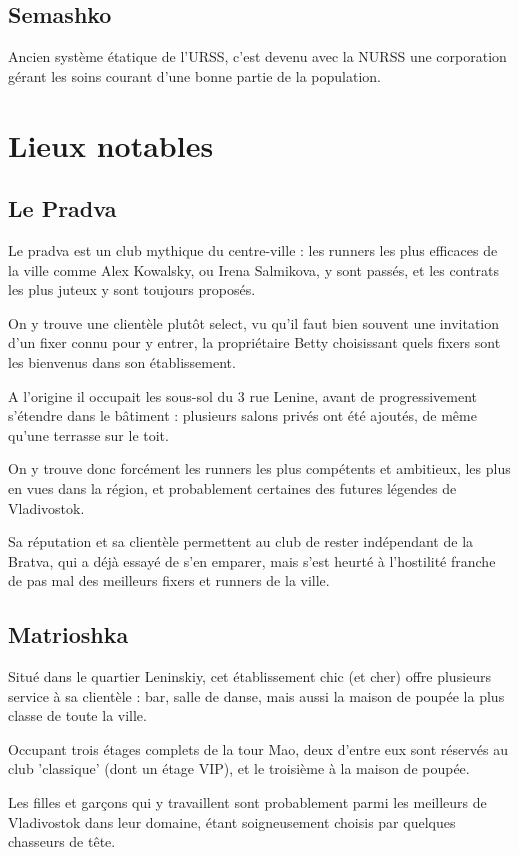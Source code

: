 \documentclass[10pt,a4paper]{book}
\begin{document}
\section{Semashko }
Ancien système étatique de l'URSS, c'est devenu avec la NURSS une corporation gérant les soins courant d'une bonne partie de la population.
\chapter{Lieux notables}
\section{Le Pradva}
Le pradva est un club mythique du centre-ville : les runners les plus efficaces de la ville comme Alex Kowalsky, ou Irena Salmikova, y sont passés, et les contrats les plus juteux y sont toujours proposés.

On y trouve une clientèle plutôt select, vu qu'il faut bien souvent une invitation d'un fixer connu pour y entrer, la propriétaire Betty choisissant quels fixers sont les bienvenus dans son établissement.

A l'origine il occupait les sous-sol du 3 rue Lenine, avant de progressivement s'étendre dans le bâtiment : plusieurs salons privés ont été ajoutés, de même qu'une terrasse sur le toit.

On y trouve donc forcément les runners les plus compétents et ambitieux, les plus en vues dans la région, et probablement certaines des futures légendes de Vladivostok.

Sa réputation et sa clientèle permettent au club de rester indépendant de la Bratva, qui a déjà essayé de s'en emparer, mais s'est heurté à l'hostilité franche de pas mal des meilleurs fixers et runners de la ville.
\section{Matrioshka}
Situé dans le quartier Leninskiy, cet établissement chic (et cher) offre plusieurs service à sa clientèle : bar, salle de danse, mais aussi la maison de poupée la plus classe de toute la ville.

Occupant trois étages complets de la tour Mao, deux d'entre eux sont réservés au club 'classique' (dont un étage VIP), et le troisième à la maison de poupée. 

Les filles et garçons qui y travaillent sont probablement parmi les meilleurs de Vladivostok dans leur domaine, étant soigneusement choisis par quelques chasseurs de tête.
\end{document}
